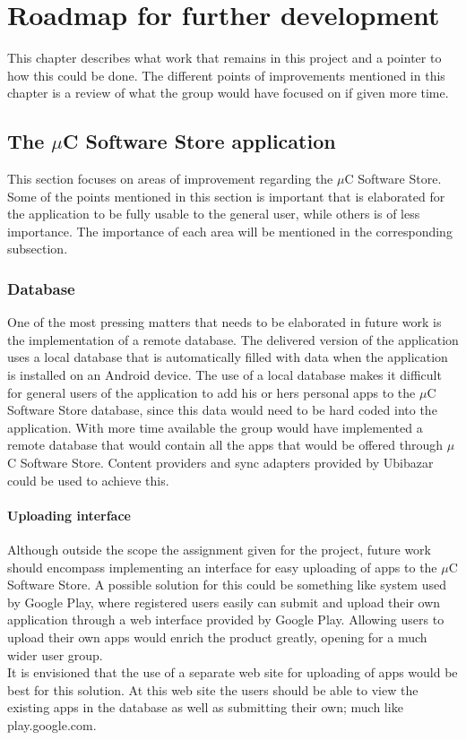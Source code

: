 \chapter{Roadmap for further development}
This chapter describes what work that remains in this project and a pointer to how this could be done. The different points of improvements mentioned in this chapter is a review of what the group would have focused on if given more time.

\section{The $\mu$C Software Store application}
This section focuses on areas of improvement regarding the $\mu$C Software Store. Some of the points mentioned in this section is important that is elaborated for the application to be fully usable to the general user, while others is of less importance. The importance of each area will be mentioned in the corresponding subsection.

	\subsection{Database}
	One of the most pressing matters that needs to be elaborated in future work is the implementation of a remote database. The delivered version of the application uses a local database that is automatically filled with data when the application is installed on an Android device. The use of a local database makes it difficult for general users of the application to add his or hers personal apps to the $\mu$C Software Store database, since this data would need to be hard coded into the application. With more time available the group would have implemented a remote database that would contain all the apps that would be offered through $\mu$C Software Store. Content providers and sync adapters provided by Ubibazar could be used to achieve this.

	\subsubsection{Uploading interface}
	Although outside the scope the assignment given for the project, future work should encompass implementing an interface for easy uploading of apps to the $\mu$C Software Store. A possible solution for this could be something like system used by Google Play, where registered users easily can submit and upload their own application through a web interface provided by Google Play. Allowing users to upload their own apps would enrich the product greatly, opening for a much wider user group.\\
	\newline
	It is envisioned that the use of a separate web site for uploading of apps would be best for this solution. At this web site the users should be able to view the existing apps in the database as well as submitting their own; much like play.google.com.

